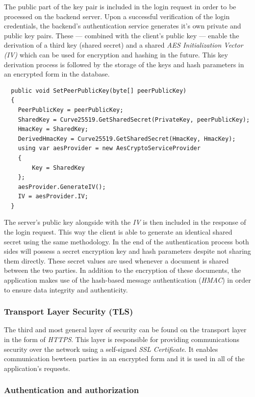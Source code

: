 The public part of the key pair is included in the login request in order to be processed on the backend server.
Upon a successful verification of the login credentials, the backend's authentication service generates it's own private and public key pairs.
These --- combined with the client's public key --- enable the derivation of a third key (shared secret) and a shared \emph{AES Initialization Vector (IV)} which can be used for encryption and hashing in the future.
This key derivation process is followed by the storage of the keys and hash parameters in an encrypted form in the database.

\begin{lstlisting}
  public void SetPeerPublicKey(byte[] peerPublicKey)
  {
	PeerPublicKey = peerPublicKey;
	SharedKey = Curve25519.GetSharedSecret(PrivateKey, peerPublicKey);
	HmacKey = SharedKey;
	DerivedHmacKey = Curve25519.GetSharedSecret(HmacKey, HmacKey);
	using var aesProvider = new AesCryptoServiceProvider
	{
		Key = SharedKey
	};
	aesProvider.GenerateIV();
	IV = aesProvider.IV;
  }
\end{lstlisting}

The server's public key alongside with the \emph{IV} is then included in the response of the login request.
This way the client is able to generate an identical shared secret using the same methodology.
In the end of the authentication process both sides will possess a secret encryption key and hash parameters despite not sharing them directly.
These secret values are used whenever a document is shared between the two parties.
In addition to the encryption of these documents, the application makes use of the hash-based message authentication (\emph{HMAC}) in order to 
ensure data integrity and authenticity.

\subsubsection{Transport Layer Security (TLS)}

The third and most general layer of security can be found on the transport layer in the form of \emph{HTTPS}.
This layer is responsible for providing communications security over the network using a self-signed \emph{SSL Certificate}.
It enables communication bewteen parties in an encrypted form and it is used in all of the application's requests.

\subsubsection{Authentication and authorization}

